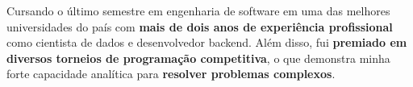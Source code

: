 \documentclass[a4paper,12pt]{article}
\begin{document}

Cursando o último semestre em engenharia de software em uma das melhores universidades do país
com \textbf{mais de dois anos de experiência profissional} como cientista de dados e desenvolvedor backend.
Além disso, fui \textbf{premiado em diversos torneios de programação competitiva}, o que demonstra minha forte
capacidade analítica para \textbf{resolver problemas complexos}.
\end{document}

